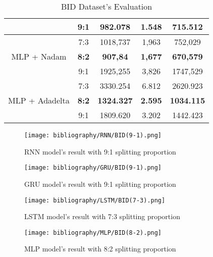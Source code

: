 \documentclass{ieeeojies}
\begin{document}
\begin{table}[H]
\begin{tabular}{|c|c|c|c|c|}
         & 9:1 & 982.078 & 1.548 & 715.512\\
         \hline
         \multirow{3}{*}{MLP + Nadam} 
         & 7:3 & 1018,737 & 1,963 & 752,029 \\ 
         & \textbf{8:2} & \textbf{907,84} &\textbf{1,677} & \textbf{670,579} \\ 
         & 9:1 & 1925,255 & 3,826 & 1747,529 \\
         \hline
         \multirow{3}{*}{MLP + Adadelta} 
         & 7:3 & 3330.254 &  6.812 &  2620.923 \\ 
         & \textbf{8:2} & \textbf{1324.327} &  \textbf{2.595} &  \textbf{1034.115} \\ 
         & 9:1 & 1809.620 & 3.202 & 1442.423\\
         \hline
    \end{tabular}
    \caption{BID Dataset's Evaluation}
    \label{vcbresult}
\end{table}

\begin{figure}[H]
  \centering
  \begin{minipage}{0.7\linewidth}
    \centering
    \texttt{[image: bibliography/RNN/BID(9-1).png]}
    \caption{RNN model's result with 9:1 splitting proportion}
    \label{fig8}
  \end{minipage}
\end{figure}

\begin{figure}[H]
  \centering
  \begin{minipage}{0.7\linewidth}
    \centering
    \texttt{[image: bibliography/GRU/BID(9-1).png]}
    \caption{GRU model's result with 9:1 splitting proportion}
    \label{fig8}
  \end{minipage}
\end{figure}

\begin{figure}[H]
  \centering
  \begin{minipage}{0.7\linewidth}
    \centering
    \texttt{[image: bibliography/LSTM/BID(7-3).png]}
    \caption{LSTM model's result with 7:3 splitting proportion}
    \label{fig8}
  \end{minipage}
\end{figure}

\begin{figure}[H]
  \centering
  \begin{minipage}{0.7\linewidth}
    \centering
    \texttt{[image: bibliography/MLP/BID(8-2).png]}
    \caption{MLP model's result with 8:2 splitting proportion}
    \label{fig8}
  \end{minipage}
\end{figure}
\end{document}
